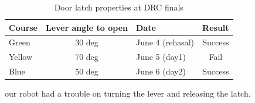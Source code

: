 %
\begin{table}[htb]
\caption{Door latch properties at DRC finals} \label{tbl:door_latch}
\begin{tabular}{lclc}
\hline
Course & Lever angle to open & Date & Result  \\ 
\hline
Green & 30 deg & June 4 (rehasal) & Success  \\
Yellow & 70 deg & June 5 (day1) & Fail \\
Blue &  50 deg & June 6 (day2)  & Success \\
\hline
\end{tabular}
\end{table}

our robot had a trouble on turning the lever and releasing the latch.
